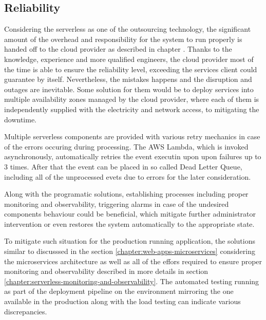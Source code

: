 
\subsection*{Reliability}

Considering the serverless as one of the outsourcing technology, the significant amount of the overhead and responsibility for the system to run properly is handed off to the cloud provider as described in chapter \label{chapter:serverless-suitability-vendor-dependence}. Thanks to the knowledge, experience and more qualified engineers, the cloud provider most of the time is able to ensure the reliability level, exceeding the services client could guarantee by itself. Nevertheless, the mistakes happens and the disruption and outages are inevitable. Some solution for them would be to deploy services into multiple availability zones managed by the cloud provider, where each of them is independently supplied with the electricity and network access, to mitigating the downtime.

Multiple serverless components are provided with various retry mechanics in case of the errors occuring during processing. The AWS Lambda, which is invoked asynchronously, automatically retries the event executin upon upon failures up to 3 times. After that the event can be placed in so called Dead Letter Queue, including all of the unprocessed evets due to errors for the later consideration. 

Along with the programatic solutions, establishing processes including proper monitoring and observability, triggering alarms in case of the undesired components behaviour could be beneficial, which mitigate further administrator intervention or even restores the system automatically to the appropriate state.

To mitigate such situation for the production running application, the solutions similar to discusssed in the section \ref{chapter:web-apps-microservices} considering the microservices architecture as well as all of the effors required to ensure proper monitoring and observability described in more details in section \ref{chapter:serverless-monitoring-and-observability}.
The automated testing running as part of the deployment pipeline on the environment mirroring the one available in the production along with the load testing can indicate various discrepancies.


